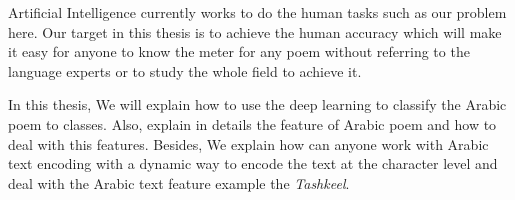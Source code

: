 Artificial Intelligence currently works to do the human tasks such as our problem here. Our target in this thesis is to achieve the human accuracy which will make it easy for anyone to know the meter for any poem without referring to the language experts or to study the whole field to achieve it.

In this thesis, We will explain how to use the deep learning to classify the Arabic poem to classes. Also, explain in details the feature of Arabic poem and how to deal with this features. Besides, We explain how can anyone work with Arabic text encoding with a dynamic way to encode the text at the character level and deal with the Arabic text feature example the  \textit{Tashkeel}.




